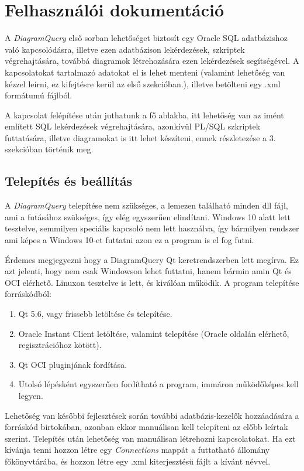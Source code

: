 \chapter{Felhasználói dokumentáció}
A \textit{DiagramQuery} első sorban lehetőséget biztosít egy Oracle SQL adatbázishoz való kapcsolódásra, illetve
ezen adatbázison lekérdezések, szkriptek végrehajtására, továbbá diagramok létrehozására ezen lekérdezések
segítségével.
A kapcsolatokat tartalmazó adatokat el is lehet menteni (valamint lehetőség van kézzel leírni,
ez kifejtésre kerül az első szekcióban.), illetve betölteni egy .xml formátumú fájlból.

A kapcsolat felépítése után juthatunk a fő ablakba, itt lehetőség van az imént említett SQL lekérdezések végrehajtására, 
azonkívül PL/SQL szkriptek futtatására,
illetve diagramokat is itt lehet készíteni, ennek részletezése a 3. szekcióban történik meg.

\section{Telepítés és beállítás}
A \textit{DiagramQuery} telepítése nem szükséges, a lemezen található minden dll fájl, ami a futásához szükséges,
így elég egyszerűen elindítani.
Windows 10 alatt lett tesztelve, semmilyen speciális kapcsoló nem lett használva, így bármilyen rendszer ami képes
a Windows 10-et futtatni azon ez a program is el fog futni.

Érdemes megjegyezni hogy a DiagramQuery Qt keretrendszerben lett megírva. Ez azt jelenti, hogy nem csak Windowson lehet
futtatni, hanem bármin amin Qt és OCI elérhető. Linuxon tesztelve is lett, és kiválóan működik. A program telepítése
forráskódból:
\begin{enumerate}
  \item Qt 5.6, vagy frissebb letöltése és telepítése.
  \item Oracle Instant Client letöltése, valamint telepítése (Oracle oldalán elérhető, regisztrációhoz kötött).
  \item Qt OCI pluginjának fordítása.
  \item Utolsó lépésként egyszerűen fordítható a program, immáron működőképes kell legyen.
\end{enumerate}

Lehetőség van későbbi fejlesztések során további adatbázis-kezelők hozzáadására a forráskód birtokában, azonban ekkor
manuálisan kell telepíteni az előbb leírtak szerint.
Telepítés után lehetőség van manuálisan létrehozni kapcsolatokat. Ha ezt kívánja tenni hozzon létre egy
\textit{Connections} mappát a futtatható állomány főkönyvtárába, és hozzon létre egy .xml kiterjesztésű fájlt a kívánt névvel.

